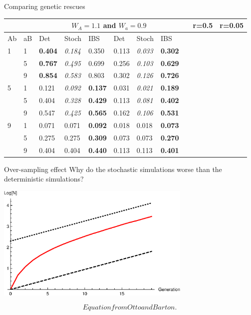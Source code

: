 \documentclass{beamer}
\begin{document}
\begin{frame}{Comparing genetic rescues}

\begin{tabular}{l | l | lll | lll}
&  & \multicolumn{6}{c}{$W_A=1.1$ and $W_a = 0.9$}
&  & \multicolumn{3}{c}{r=0.5} & \multicolumn{3}{c}{r=0.05} \\
\midrule
Ab& aB & Det & Stoch & IBS & Det & Stoch & IBS \\
\midrule
1 & 1 & \textbf{0.404} &\textit{0.184}& 0.350         & 0.113 & \textit{0.033} & \textbf{0.302} \\
     & 5 & \textbf{0.767} & \textit{0.495} & 0.699   & 0.256 & \textit{0.103} & \textbf{0.629}  \\
     & 9 & \textbf{0.854} & \textit{0.583} & 0.803   & 0.302 & \textit{0.126} &  \textbf{0.726}\\
     \midrule
5 & 1 & 0.121 & \textit{0.092} &  \textbf{0.137}         & 0.031 & \textit{0.021} & \textbf{0.189} \\
     & 5 & 0.404 & \textit{0.328} & \textbf{0.429}       & 0.113 & \textit{0.081} & \textbf{0.402}\\
     & 9 & 0.547 & \textit{0.425} & \textbf{0.565}    & 0.162 & \textit{0.106} & \textbf{0.531} \\
     \midrule
9 & 1 & 0.071 & 0.071 & \textbf{0.092}         & 0.018 & 0.018 & \textbf{0.073}\\
     & 5 & 0.275 & 0.275 & \textbf{0.309}  & 0.073 & 0.073 & \textbf{0.270}  \\
     & 9 & 0.404 & 0.404 & \textbf{0.440}   & 0.113 & 0.113 & \textbf{0.401} \\
\end{tabular}
\end{frame}

\begin{frame}{Over-sampling effect}
    Why do the stochastic simulations worse than the deterministic simulations?
    \vfill

\includegraphics[width=0.7\textwidth]{Rfiles/figures/PlotSimGrowth.eps}

\begin{equation*}
    Equation from Otto and Barton.
\end{equation*}
    
\end{frame}
\end{document}
